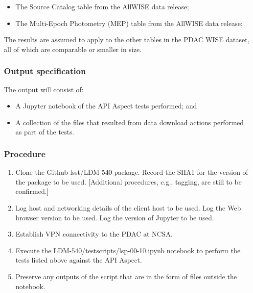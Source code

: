 \begin{itemize}

  \item{The Source Catalog table from the AllWISE data release;}
  \item{The Multi-Epoch Photometry (MEP) table from the AllWISE data release;}

\end{itemize}

The results are assumed to apply to the other tables in the PDAC WISE dataset, all of which are comparable or smaller in size.

\subsubsection{Output specification}

The output will consist of:

\begin{itemize}
  \item{A Jupyter notebook of the API Aspect tests performed; and}
  \item{A collection of the files that resulted from data download actions performed as part of the tests.}
\end{itemize}


\subsubsection{Procedure}

\begin{enumerate}

  \item{Clone the Github lsst/LDM-540 package.  Record the SHA1 for the version of the package to be used.  [Additional procedures, e.g., tagging, are still to be confirmed.]}
  \item{Log host and networking details of the client host to be used.
 Log the Web browser version to be used.
 Log the version of Jupyter to be used.}
  \item{Establish VPN connectivity to the PDAC at NCSA.}
  \item{Execute the LDM-540/test\textunderscore scripts/lsp-00-10.ipynb notebook to perform the tests listed above against the API Aspect.}
  \item{Preserve any outputs of the script that are in the form of files outside the notebook.}

\end{enumerate}
